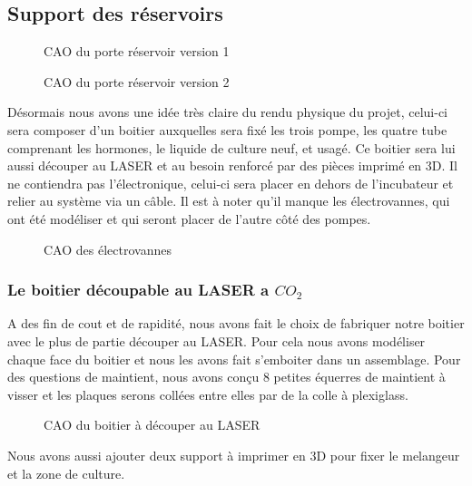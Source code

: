 \documentclass[a4paper, 11pt]{article}
\begin{document}
\subsection{Support des réservoirs}
\begin{multicols}{2}
    \begin{figure}[H]
        \centering
        \caption{CAO du porte réservoir version 1}
        \label{fig:CAO_reservoir1}
    \end{figure}
    \begin{figure}[H]
        \centering
        \caption{CAO du porte réservoir version 2}
        \label{fig:CAO_reservoir2}
    \end{figure}
\end{multicols}
Désormais nous avons une idée très claire du rendu physique du projet, celui-ci sera composer d'un boitier auxquelles sera fixé les trois pompe, les quatre tube comprenant les hormones, le liquide de culture neuf, et usagé.
Ce boitier sera lui aussi découper au LASER et au besoin renforcé par des pièces imprimé en 3D.
Il ne contiendra pas l'électronique, celui-ci sera placer en dehors de l'incubateur et relier au système via un câble.
Il est à noter qu'il manque les électrovannes, qui ont été modéliser et qui seront placer de l'autre côté des pompes.
\begin{figure}[H]
    \centering
    \caption{CAO des électrovannes}
    \label{fig:CAO_electrovanne}
\end{figure}
\subsubsection{Le boitier découpable au LASER a $ CO_2 $}
A des fin de cout et de rapidité, nous avons fait le choix de fabriquer notre boitier avec le 
plus de partie découper au LASER. Pour cela nous avons modéliser chaque face du boitier et nous 
les avons fait s'emboiter dans un assemblage.
Pour des questions de maintient, nous avons conçu 8 petites équerres de maintient à visser
et les plaques serons collées entre elles par de la colle à plexiglass.
\begin{figure}[H]
    \centering
    \caption{CAO du boitier à découper au LASER}
    \label{fig:CAO_boitier_decoupe_LASER}
\end{figure}
Nous avons aussi ajouter deux support à imprimer en 3D pour fixer le melangeur et la zone de culture.
\end{document}
